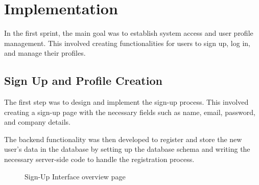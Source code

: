 \section{Implementation}
In the first sprint, the main goal was to establish system access and user profile management. This involved creating functionalities for users to sign up, log in, and manage their profiles.

\subsection{Sign Up and Profile Creation} 

The first step was to design and implement the sign-up process. This involved creating a sign-up page with the necessary fields such as name, email, password, and company details.

The backend functionality was then developed to register and store the new user's data in the database by setting up the database schema and writing the necessary server-side code to handle the registration process.

\begin{figure}[H]
    \centering
    \caption{ Sign-Up Interface overview page}
    \label{fig:Sign-Up-Interface-overview-page}
\end{figure}

